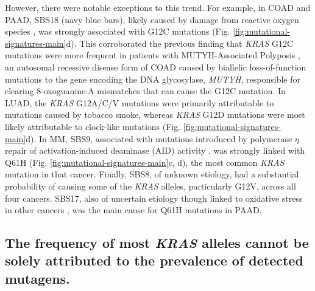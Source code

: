 \documentclass[english, 10pt, letterpaper]{article}
\newcommand{\KRAS}{\emph{KRAS}}
\begin{document}
However, there were notable exceptions to this trend.
For example, in COAD and PAAD, SBS18 (navy blue bars), likely caused by damage from reactive oxygen species \cite{Viel2017, Pilati2017}, was strongly associated with G12C mutations (Fig. \ref{fig:mutational-signatures-main}d).
This corroborated the previous finding that \KRAS{} G12C mutations were more frequent in patients with MUTYH-Associated Polyposis \cite{Viel2017}, an autosomal recessive disease form of COAD caused by biallelic loss-of-function mutations to the gene encoding the DNA glycosylase, \emph{MUTYH}, responsible for clearing 8-oxoguanine:A mismatches that can cause the G12C mutation.
In LUAD, the \KRAS{} G12A/C/V mutations were primarily attributable to mutations caused by tobacco smoke, whereas \KRAS{} G12D mutations were most likely attributable to clock-like mutations (Fig. \ref{fig:mutational-signatures-main}d).
In MM, SBS9, associated with mutations introduced by polymerase $\eta$ repair of activation-induced deaminase (AID) activity \cite{Alexandrov2013, Rogozin2018DNACancer., Petljak2016UnderstandingCancer.}, was strongly linked with Q61H (Fig. \ref{fig:mutational-signatures-main}c, d), the most common \KRAS{} mutation in that cancer.
Finally, SBS8, of unknown etiology, had a substantial probability of causing some of the \KRAS{} alleles, particularly G12V, across all four cancers.
SBS17, also of uncertain etiology though linked to oxidative stress in other cancers \cite{Tomkova2018MutationalAsymmetry}, was the main cause for Q61H mutations in PAAD.


\subsection*{The frequency of most \KRAS{} alleles cannot be solely attributed to the prevalence of detected mutagens.}
\end{document}
